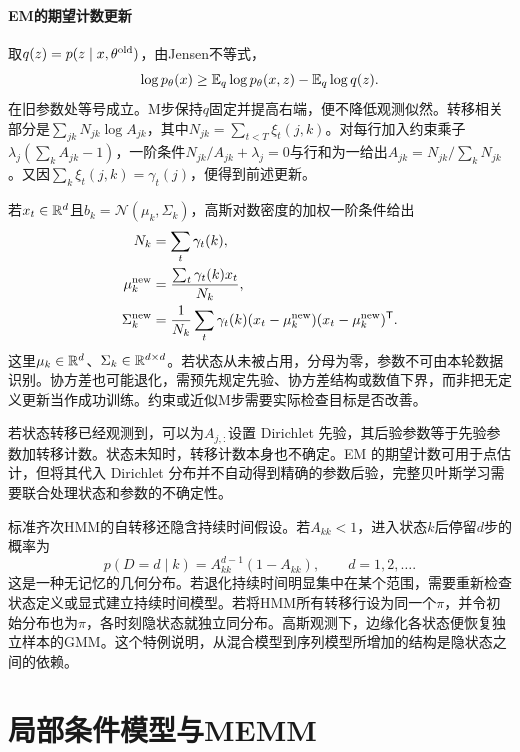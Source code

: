 \paragraph{EM的期望计数更新}
取$q(z)=p(z\mid x,\theta^{\rm old})$，由Jensen不等式，
\begin{equation}
 \log p_\theta(x)\geq\mathbb{E}_q\log p_\theta(x,z)-\mathbb{E}_q\log q(z).
\end{equation}
在旧参数处等号成立。M步保持$q$固定并提高右端，便不降低观测似然。转移相关部分是$\sum_{jk}N_{jk}\log A_{jk}$，其中$N_{jk}=\sum_{t<T}\xi_t(j,k)$。对每行加入约束乘子$\lambda_j(\sum_kA_{jk}-1)$，一阶条件$N_{jk}/A_{jk}+\lambda_j=0$与行和为一给出$A_{jk}=N_{jk}/\sum_kN_{jk}$。又因$\sum_k\xi_t(j,k)=\gamma_t(j)$，便得到前述更新。

若$x_t\in\mathbb{R}^d$且$b_k=\mathcal N(\mu_k,\Sigma_k)$，高斯对数密度的加权一阶条件给出
\begin{equation}
 \begin{aligned}
 N_k&=\sum_t\gamma_t(k),\\
 \mu_k^{\rm new}&=\frac{\sum_t\gamma_t(k)x_t}{N_k},\\
 \Sigma_k^{\rm new}&=\frac{1}{N_k}\sum_t\gamma_t(k)
 (x_t-\mu_k^{\rm new})(x_t-\mu_k^{\rm new})^{\mathsf T}.
 \end{aligned}
\end{equation}
这里$\mu_k\in\mathbb{R}^d$、$\Sigma_k\in\mathbb{R}^{d\times d}$。若状态从未被占用，分母为零，参数不可由本轮数据识别。协方差也可能退化，需预先规定先验、协方差结构或数值下界，而非把无定义更新当作成功训练。约束或近似M步需要实际检查目标是否改善。

若状态转移已经观测到，可以为$A_{j,:}$设置 Dirichlet 先验，其后验参数等于先验参数加转移计数。状态未知时，转移计数本身也不确定。EM 的期望计数可用于点估计，但将其代入 Dirichlet 分布并不自动得到精确的参数后验，完整贝叶斯学习需要联合处理状态和参数的不确定性。

标准齐次HMM的自转移还隐含持续时间假设。若$A_{kk}<1$，进入状态$k$后停留$d$步的概率为
\begin{equation}
 p(D=d\mid k)=A_{kk}^{d-1}(1-A_{kk}),\qquad d=1,2,\ldots.
\end{equation}
这是一种无记忆的几何分布。若退化持续时间明显集中在某个范围，需要重新检查状态定义或显式建立持续时间模型。若将HMM所有转移行设为同一个$\pi$，并令初始分布也为$\pi$，各时刻隐状态就独立同分布。高斯观测下，边缘化各状态便恢复独立样本的GMM。这个特例说明，从混合模型到序列模型所增加的结构是隐状态之间的依赖。

\section{局部条件模型与MEMM}
